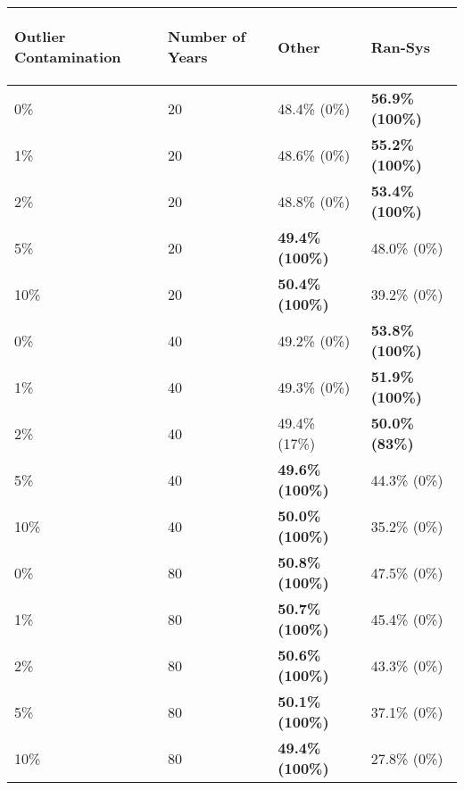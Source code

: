 \begin{table}[ht]
\centering
\begin{tabular}{llll}
  \hline
\begin{sideways} Outlier Contamination \end{sideways} & \begin{sideways} Number of Years \end{sideways} & \begin{sideways} Other \end{sideways} & \begin{sideways} Ran-Sys \end{sideways} \\ 
  \hline
0\% & 20 & 48.4\% (0\%) & \textbf{56.9\% (100\%)} \\ 
  1\% & 20 & 48.6\% (0\%) & \textbf{55.2\% (100\%)} \\ 
  2\% & 20 & 48.8\% (0\%) & \textbf{53.4\% (100\%)} \\ 
  5\% & 20 & \textbf{49.4\% (100\%)} & 48.0\% (0\%) \\ 
  10\% & 20 & \textbf{50.4\% (100\%)} & 39.2\% (0\%) \\ 
  0\% & 40 & 49.2\% (0\%) & \textbf{53.8\% (100\%)} \\ 
  1\% & 40 & 49.3\% (0\%) & \textbf{51.9\% (100\%)} \\ 
  2\% & 40 & 49.4\% (17\%) & \textbf{50.0\% (83\%)} \\ 
  5\% & 40 & \textbf{49.6\% (100\%)} & 44.3\% (0\%) \\ 
  10\% & 40 & \textbf{50.0\% (100\%)} & 35.2\% (0\%) \\ 
  0\% & 80 & \textbf{50.8\% (100\%)} & 47.5\% (0\%) \\ 
  1\% & 80 & \textbf{50.7\% (100\%)} & 45.4\% (0\%) \\ 
  2\% & 80 & \textbf{50.6\% (100\%)} & 43.3\% (0\%) \\ 
  5\% & 80 & \textbf{50.1\% (100\%)} & 37.1\% (0\%) \\ 
  10\% & 80 & \textbf{49.4\% (100\%)} & 27.8\% (0\%) \\ 
   \hline
\end{tabular}
\end{table}
